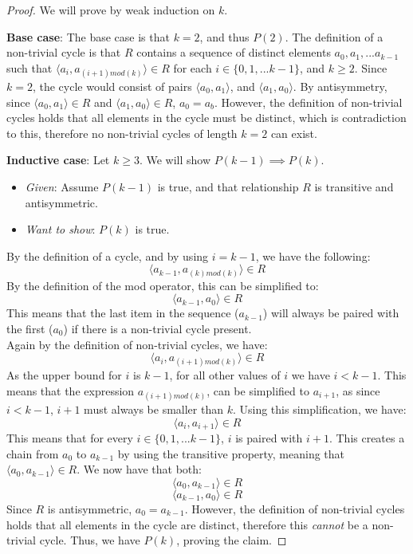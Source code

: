 \documentclass[titlepage]{article}
\begin{document}
\begin{proof}
We will prove by weak induction on $k$.

\textbf{Base case}: The base case is that $k=2$, and thus $P(2)$. The definition of a non-trivial cycle is that $R$ contains a sequence of distinct elements $a_0,a_1,...a_{k-1}$ such that $\langle a_i, a_{(i+1)mod(k)}\rangle \in R$ for each $i \in \{0,1,...k-1\}$, and $k \geq 2$. Since $k=2$, the cycle would consist of pairs $\langle a_0, a_1 \rangle$, and $\langle a_1, a_0\rangle$. By antisymmetry, since $\langle a_0, a_1 \rangle \in R$ and $\langle a_1, a_0 \rangle \in R$, $a_0 = a_b$. However, the definition of non-trivial cycles holds that all elements in the cycle must be distinct, which is contradiction to this, therefore no non-trivial cycles of length $k=2$ can exist.


\textbf{Inductive case}: Let $k \geq 3$.  We will show $P(k-1) \implies P(k)$.
\begin{itemize}
\item \emph{Given}: Assume $P(k-1)$ is true, and that relationship $R$ is transitive and antisymmetric.
\item \emph{Want to show}: $P(k)$ is true.
\end{itemize}
By the definition of a cycle, and by using $i=k-1$, we have the following:
$$\langle a_{k-1},a_{(k)mod(k)} \rangle \in R$$
By the definition of the mod operator, this can be simplified to:
$$\langle a_{k-1},a_0 \rangle \in R$$
This means that the last item in the sequence ($a_{k-1}$) will always be paired with the first ($a_0$) if there is a non-trivial cycle present. 	
\\
Again by the definition of non-trivial cycles, we have:
$$\langle a_{i},a_{(i+1)mod(k)} \rangle \in R$$
As the upper bound for $i$ is $k-1$, for all other values of $i$ we have $i < k-1$. This means that the expression $a_{(i+1)mod(k)}$, can be simplified to $a_{i+1}$, as since $i < k-1$, $i + 1$ must always be smaller than $k$. Using this simplification, we have:
$$\langle a_{i},a_{i+1} \rangle \in R$$
This means that for every $i \in \{0,1,...k-1\}$, $i$ is paired with $i+1$. This creates a chain from $a_0$ to $a_{k-1}$ by using the transitive property, meaning that $\langle a_0, a_{k-1}\rangle \in R$. We now have that both:
$$\langle a_0, a_{k-1}\rangle \in R$$
$$\langle a_{k-1},a_0 \rangle \in R$$
Since $R$ is antisymmetric, $a_0 = a_{k-1}$. However, the definition of non-trivial cycles holds that all elements in the cycle are distinct, therefore this \emph{cannot} be a non-trivial cycle. Thus, we have $P(k)$, proving the claim.
\end{proof}
\end{document}
